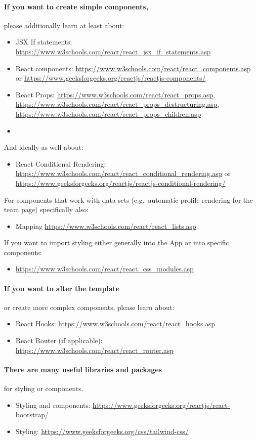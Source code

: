 \paragraph{If you want to create simple components,} please additionally learn at least about:
\begin{itemize}
    \item JSX If statements: \url{https://www.w3schools.com/react/react_jsx_if_statements.asp}
    \item React components: \url{https://www.w3schools.com/react/react_components.asp} or \url{https://www.geeksforgeeks.org/reactjs/reactjs-components/}
    \item React Props: \url{https://www.w3schools.com/react/react_props.asp}, \url{https://www.w3schools.com/react/react_props_destructuring.asp}, \url{https://www.w3schools.com/react/react_props_children.asp}
    \item
\end{itemize}
And ideally as well about:
\begin{itemize}
    \item React Conditional Rendering: \url{https://www.w3schools.com/react/react_conditional_rendering.asp} or \url{https://www.geeksforgeeks.org/reactjs/reactjs-conditional-rendering/}
\end{itemize}
For components that work with data sets (e.g.\ automatic profile rendering for the team page) specifically also:
\begin{itemize}
    \item Mapping \url{https://www.w3schools.com/react/react_lists.asp}
\end{itemize}
If you want to import styling either generally into the App or into specific components: 
\begin{itemize}
    \item \url{https://www.w3schools.com/react/react_css_modules.asp}
\end{itemize}
\paragraph{If you want to alter the template} or create more complex components, please learn about:
\begin{itemize}
    \item React Hooks: \url{https://www.w3schools.com/react/react_hooks.asp}
    \item React Router (if applicable): \url{https://www.w3schools.com/react/react_router.asp}
\end{itemize}
\paragraph{There are many useful libraries and packages} for styling or components.
\begin{itemize}
    \item Styling and components: \url{https://www.geeksforgeeks.org/reactjs/react-bootstrap/}
    \item Styling: \url{https://www.geeksforgeeks.org/css/tailwind-css/}
\end{itemize}
